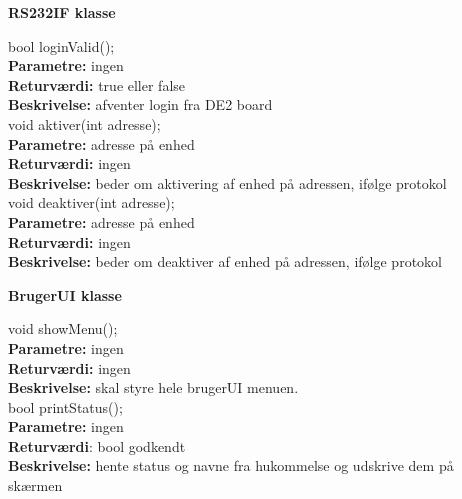 {\centering 
\textbf{RS232IF klasse}\par
}

bool loginValid(); \\
\textbf{Parametre:} ingen \\
\textbf{Returværdi:} true eller false \\
\textbf{Beskrivelse:} afventer login fra DE2 board \\

void aktiver(int adresse); \\
\textbf{Parametre:} adresse på enhed \\
\textbf{Returværdi:} ingen \\
\textbf{Beskrivelse:} beder om aktivering af enhed på adressen, ifølge protokol \\

void deaktiver(int adresse); \\
\textbf{Parametre:} adresse på enhed \\
\textbf{Returværdi:} ingen \\
\textbf{Beskrivelse:} beder om deaktiver af enhed på adressen, ifølge protokol \\

{\centering 
\textbf{BrugerUI klasse}\par
}

void showMenu(); \\
\textbf{Parametre:} ingen \\
\textbf{Returværdi:} ingen \\
\textbf{Beskrivelse:} skal styre hele brugerUI menuen. \\

bool printStatus(); \\
\textbf{Parametre:} ingen \\
\textbf{Returværdi}: bool godkendt \\
\textbf{Beskrivelse:} hente status og navne fra hukommelse og udskrive dem på skærmen \\












